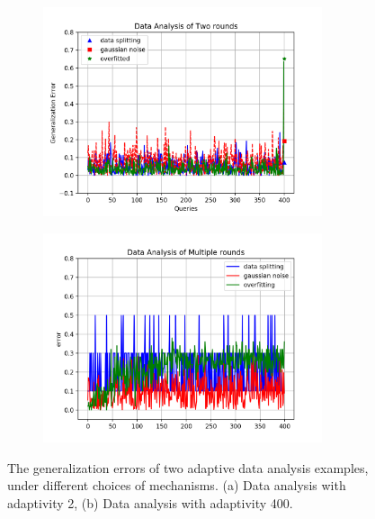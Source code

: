 {\small
\begin{figure}
\centering
\begin{subfigure}{.48\textwidth}
\begin{centering}
\includegraphics[width=0.9\textwidth]{figures/tworound.png}
\caption{}
\end{centering}
\end{subfigure}
\quad
\begin{subfigure}{.48\textwidth}
\begin{centering}
\includegraphics[width=0.9\textwidth]{figures/multipleround.png}
\caption{}
\end{centering}
\end{subfigure}
\vspace{-0.4cm}
 \caption{
 The generalization errors of two adaptive data analysis examples, under different choices of mechanisms.
 (a) Data analysis with adaptivity 2, 
 (b) Data analysis with adaptivity 400. 
}
\label{fig:generalization_errors}
\vspace{-0.5cm}
\end{figure}
}


